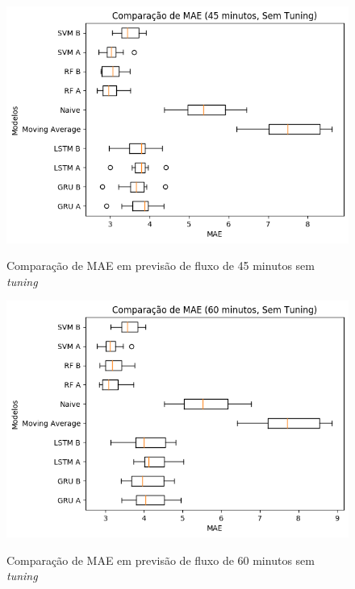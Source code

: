 \begin{figure}[htbp]
    \centering
    \includegraphics[scale=0.8]{monography/img/snapshots/comparacao_de_mae_(45_minutos,_sem_tuning)_performance_boxes.png}
    \label{figure:comparacao_previsao_mae_45_sem_tuning}
    \caption{Comparação de MAE em previsão de fluxo de 45 minutos sem \textit{tuning}}
\end{figure}

\begin{figure}[htbp]
    \centering
    \includegraphics[scale=0.8]{monography/img/snapshots/comparacao_de_mae_(60_minutos,_sem_tuning)_performance_boxes.png}
    \label{figure:comparacao_previsao_mae_60_sem_tuning}
    \caption{Comparação de MAE em previsão de fluxo de 60 minutos sem \textit{tuning}}
\end{figure}

